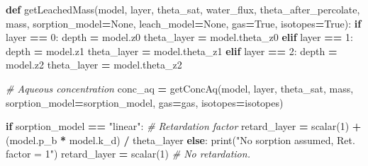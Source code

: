 \documentclass[]{article}
\newenvironment{Shaded}{\begin{snugshade}}{\end{snugshade}}
\newcommand{\KeywordTok}[1]{\textcolor[rgb]{0.13,0.29,0.53}{\textbf{{#1}}}}
\newcommand{\DecValTok}[1]{\textcolor[rgb]{0.00,0.00,0.81}{{#1}}}
\newcommand{\StringTok}[1]{\textcolor[rgb]{0.31,0.60,0.02}{{#1}}}
\newcommand{\CommentTok}[1]{\textcolor[rgb]{0.56,0.35,0.01}{\textit{{#1}}}}
\newcommand{\VariableTok}[1]{\textcolor[rgb]{0.00,0.00,0.00}{{#1}}}
\newcommand{\ControlFlowTok}[1]{\textcolor[rgb]{0.13,0.29,0.53}{\textbf{{#1}}}}
\newcommand{\OperatorTok}[1]{\textcolor[rgb]{0.81,0.36,0.00}{\textbf{{#1}}}}
\newcommand{\BuiltInTok}[1]{{#1}}
\newcommand{\NormalTok}[1]{{#1}}
\begin{document}
\begin{Shaded}
\begin{Highlighting}[]
\KeywordTok{def} \NormalTok{getLeachedMass(model, layer, theta_sat,}
                   \NormalTok{water_flux,}
                   \NormalTok{theta_after_percolate,}
                   \NormalTok{mass,}
                   \NormalTok{sorption_model}\OperatorTok{=}\VariableTok{None}\NormalTok{,}
                   \NormalTok{leach_model}\OperatorTok{=}\VariableTok{None}\NormalTok{, gas}\OperatorTok{=}\VariableTok{True}\NormalTok{, isotopes}\OperatorTok{=}\VariableTok{True}\NormalTok{):}
    \ControlFlowTok{if} \NormalTok{layer }\OperatorTok{==} \DecValTok{0}\NormalTok{:}
        \NormalTok{depth }\OperatorTok{=} \NormalTok{model.z0}
        \NormalTok{theta_layer }\OperatorTok{=} \NormalTok{model.theta_z0}
    \ControlFlowTok{elif} \NormalTok{layer }\OperatorTok{==} \DecValTok{1}\NormalTok{:}
        \NormalTok{depth }\OperatorTok{=} \NormalTok{model.z1}
        \NormalTok{theta_layer }\OperatorTok{=} \NormalTok{model.theta_z1}
    \ControlFlowTok{elif} \NormalTok{layer }\OperatorTok{==} \DecValTok{2}\NormalTok{:}
        \NormalTok{depth }\OperatorTok{=} \NormalTok{model.z2}
        \NormalTok{theta_layer }\OperatorTok{=} \NormalTok{model.theta_z2}

    \CommentTok{# Aqueous concentration}
    \NormalTok{conc_aq }\OperatorTok{=} \NormalTok{getConcAq(model, layer, theta_sat, mass,}
                        \NormalTok{sorption_model}\OperatorTok{=}\NormalTok{sorption_model, gas}\OperatorTok{=}\NormalTok{gas, isotopes}\OperatorTok{=}\NormalTok{isotopes)}

    \ControlFlowTok{if} \NormalTok{sorption_model }\OperatorTok{==} \StringTok{"linear"}\NormalTok{:}
        \CommentTok{# Retardation factor}
        \NormalTok{retard_layer }\OperatorTok{=} \NormalTok{scalar(}\DecValTok{1}\NormalTok{) }\OperatorTok{+} \NormalTok{(model.p_b }\OperatorTok{*} \NormalTok{model.k_d) }\OperatorTok{/} \NormalTok{theta_layer}
    \ControlFlowTok{else}\NormalTok{:}
        \BuiltInTok{print}\NormalTok{(}\StringTok{"No sorption assumed, Ret. factor = 1"}\NormalTok{)}
        \NormalTok{retard_layer }\OperatorTok{=} \NormalTok{scalar(}\DecValTok{1}\NormalTok{)  }\CommentTok{# No retardation.}


\end{Highlighting}
\end{Shaded}
\end{document}
